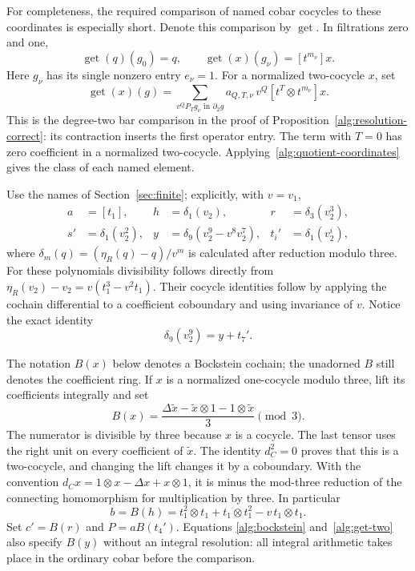 \documentclass[11pt]{article}
\theoremstyle{definition}
\theoremstyle{remark}
\numberwithin{equation}{section}
\begin{document}
For completeness, the required comparison of named cobar cocycles to
these coordinates is especially short.  Denote this comparison by
$\operatorname{get}$.  In filtrations zero and one,
\[
 \operatorname{get}(q)(g_0)=q,\qquad
 \operatorname{get}(x)(g_\nu)=[t^{m_\nu}]x.
\]
Here $g_\nu$ has its single nonzero entry $e_\nu=1$.  For a normalized
two-cocycle $x$, set
\begin{equation}\label{alg:get-two}
 \operatorname{get}(x)(g)
   =\sum_{v^QP_Tg_\nu\text{ in }\partial_2g}
       a_{Q,T,\nu}\,v^Q[t^T\otimes t^{m_\nu}]x.
\end{equation}
This is the degree-two bar comparison in the proof of
Proposition~\ref{alg:resolution-correct}: its contraction inserts the
first operator entry.  The term with $T=0$ has zero coefficient in a
normalized two-cocycle.  Applying~\eqref{alg:quotient-coordinates} gives
the class of each named element.

Use the names of Section~\ref{sec:finite}; explicitly, with $v=v_1$,
\begin{align*}
 a&=[t_1],& h&=\delta_1(v_2),& r&=\delta_3(v_2^3),\\
 s'&=\delta_1(v_2^2),&
 y&=\delta_9(v_2^9-v^8v_2^7),&
 t_i'&=\delta_1(v_2^i),
\end{align*}
where $\delta_m(q)=(\eta_R(q)-q)/v^m$ is calculated after reduction
modulo three.  For these polynomials divisibility follows directly from
$\eta_R(v_2)-v_2=v(t_1^3-v^2t_1)$.  Their cocycle identities follow by
applying the cochain differential to a coefficient coboundary and
using invariance of $v$.  Notice the exact identity
\begin{equation}\label{alg:y-convention}
 \delta_9(v_2^9)=y+t_7'.
\end{equation}

The notation $B(x)$ below denotes a Bockstein cochain; the unadorned
$B$ still denotes the coefficient ring.
If $x$ is a normalized one-cocycle modulo three, lift its coefficients
integrally and set
\begin{equation}\label{alg:bockstein}
 B(x)=\frac{\Delta\widetilde x-\widetilde x\otimes1
                           -1\otimes\widetilde x}{3}\pmod3.
\end{equation}
The numerator is divisible by three because $x$ is a cocycle.  The
last tensor uses the right unit on every coefficient of $\widetilde x$.
The identity $d_C^2=0$ proves that this is a two-cocycle, and changing
the lift changes it by a coboundary.  With the convention
$d_Cx=1\otimes x-\Delta x+x\otimes1$, it is minus the mod-three
reduction of the connecting homomorphism for multiplication by three.
In particular
\begin{equation}\label{alg:b-sign-check}
 b=B(h)=t_1^2\otimes t_1+t_1\otimes t_1^2
                           -v\,t_1\otimes t_1.
\end{equation}
Set $c'=B(r)$ and $P=aB(t_4')$.  Equations
\eqref{alg:bockstein} and~\eqref{alg:get-two} also specify $B(y)$
without an integral resolution: all integral arithmetic takes place in
the ordinary cobar before the comparison.
\end{document}
